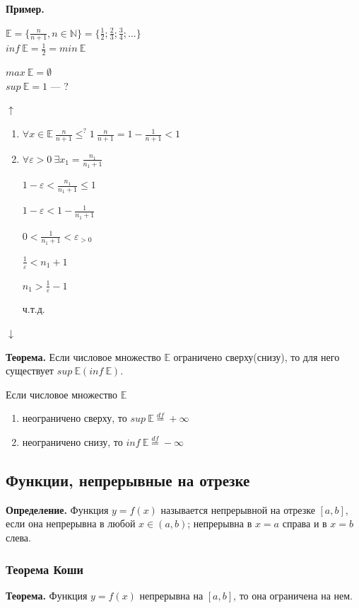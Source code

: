\documentclass{article}
\begin{document}
    \textbf{Пример.}
    
    \( \mathbb{E} = \{ \frac{n}{n + 1}, n \in \mathbb{N} \} = \{ \frac{1}{2}; \frac{2}{3}; \frac{3}{4}; ... \} \)\\
    \( inf\ \mathbb{E} = \frac{1}{2} = min\ \mathbb{E} \)

    \(max\ \mathbb{E} = \emptyset\)\\
    \(sup\ \mathbb{E} = 1\) --- ?

    \(\uparrow\)
    \begin{enumerate}
        \item \(\forall x \in \mathbb{E}\ \frac{n}{n+1} \leq^{?} 1\ \frac{n}{n+1} = 1 - \frac{1}{n+1} < 1\)
        \item \( \forall \varepsilon > 0\ \exists x_1 = \frac{n_1}{n_1 + 1} \)
        
        \( 1 - \varepsilon < \frac{n_1}{n_1 + 1} \leq 1 \)

        \( 1 - \varepsilon < 1 - \frac{1}{n_1 + 1} \)
        
        \( 0 < \frac{1}{n_1 + 1} < \varepsilon_{> 0} \)

        \( \frac{1}{\varepsilon} < n_1 + 1 \)

        \( n_1 > \frac{1}{\varepsilon} - 1\)
        
        ч.т.д.
    \end{enumerate}
    \(\downarrow\)
    
    \textbf{Теорема.} Если числовое множество \(\mathbb{E}\) ограничено сверху(снизу), то для него существует \(sup\ \mathbb{E}(inf\ \mathbb{E})\).

    Если числовое множество \(\mathbb{E}\)  
    \begin{enumerate}
        \item неограничено сверху, то \(sup\ \mathbb{E} \stackrel{df}{=} +\infty\)
        \item неограничено снизу, то \(inf\ \mathbb{E} \stackrel{df}{=} -\infty\)
    \end{enumerate}

    \subsection{Функции, непрерывные на отрезке}
    \textbf{Определение.} Функция \( y = f(x) \) называется непрерывной на отрезке \( [a, b] \), если она непрерывна в любой \( x \in (a, b) \); непрерывна в \( x = a \) справа и в \( x = b \) слева.


    \subsubsection{Теорема Коши}
    \textbf{Теорема.} Функция \( y = f(x) \) непрерывна на \( [a, b] \), то она ограничена на нем.
\end{document}
